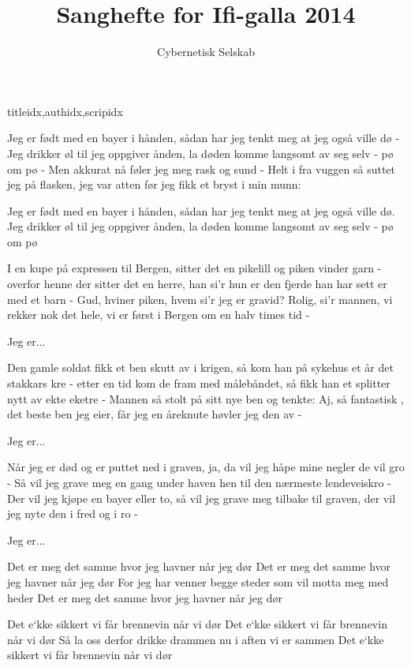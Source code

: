 \documentclass[14pt,letterpaper,norsk]{article}
\title{Sanghefte for Ifi-galla 2014}
\author{Cybernetisk Selskab}
\date{}
\begin{document}

\newpage

\begin{songs}{titleidx,authidx,scripidx}

\beginverse
Jeg er født med en bayer i hånden,
sådan har jeg tenkt meg at jeg også ville dø -
Jeg drikker øl til jeg oppgiver ånden,
la døden komme langsomt av seg selv - pø om pø -
Men akkurat nå føler jeg meg rask og sund -
Helt i fra vuggen så suttet jeg på flasken,
jeg var atten før jeg fikk et bryst i min munn:
\endverse

\beginchorus
Jeg er født med en bayer i hånden,
sådan har jeg tenkt meg at jeg også ville dø.
Jeg drikker øl til jeg oppgiver ånden,
la døden komme langsomt av seg selv - pø om pø
\endchorus

\beginverse
I en kupe på expressen til Bergen,
sitter det en pikelill og piken vinder garn -
overfor henne der sitter det en herre,
han si'r hun er den fjerde han har sett er med et barn -
Gud, hviner piken, hvem si'r jeg er gravid?
Rolig, si'r mannen, vi rekker nok det hele,
vi er først i Bergen om en halv times tid -
\endverse

\beginchorus
Jeg er...
\endchorus

\beginverse
Den gamle soldat fikk et ben skutt av i krigen,
så kom han på sykehus et år det stakkars kre -
etter en tid kom de fram med målebåndet,
så fikk han et splitter nytt av ekte eketre -
Mannen så stolt på sitt nye ben og tenkte:
Aj, så fantastisk , det beste ben jeg eier,
får jeg en åreknute høvler jeg den av -
\endverse

\beginchorus
Jeg er...
\endchorus

\beginverse
Når jeg er død og er puttet ned i graven,
ja, da vil jeg håpe mine negler de vil gro -
Så vil jeg grave meg en gang under haven
hen til den nærmeste lendeveiskro -
Der vil jeg kjøpe en bayer eller to,
så vil jeg grave meg tilbake til graven,
der vil jeg nyte den i fred og i ro -
\endverse

\beginchorus
Jeg er...
\endchorus
\endsong

\beginverse
Det er meg det samme hvor jeg havner når jeg dør
Det er meg det samme hvor jeg havner når jeg dør
For jeg har venner begge steder som vil motta meg med heder
Det er meg det samme hvor jeg havner når jeg dør
\endverse

\beginverse
Det e`kke sikkert vi får brennevin når vi dør
Det e`kke sikkert vi får brennevin når vi dør
Så la oss derfor drikke drammen nu i aften vi er sammen
Det e`kke sikkert vi får brennevin når vi dør
\endverse


\end{songs}
\end{document}
